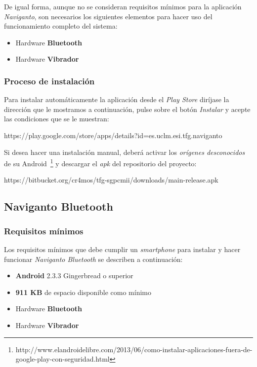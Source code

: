 De igual forma, aunque no se consideran requisitos mínimos para la aplicación \emph{Naviganto}, son
necesarios los siguientes elementos para hacer uso del funcionamiento completo del sistema:

\begin{itemize}
  \item Hardware \textbf{Bluetooth}
  \item Hardware \textbf{Vibrador}
\end{itemize}

\subsubsection{Proceso de instalación}

Para instalar automáticamente la aplicación desde el \emph{Play Store} diríjase la dirección que le
mostramos a continuación, pulse sobre el botón \emph{Instalar} y acepte las condiciones que se le
muestran:

\begin{listing}
https://play.google.com/store/apps/details?id=es.uclm.esi.tfg.naviganto
\end{listing}

Si desea hacer una instalación manual, deberá activar los \emph{orígenes desconocidos} de su
Android~\footnote{http://www.elandroidelibre.com/2013/06/como-instalar-aplicaciones-fuera-de-google-play-con-seguridad.html}
y descargar el \emph{apk} del repositorio del proyecto:

\begin{listing}
https://bitbucket.org/cr4mos/tfg-sgpcmii/downloads/main-release.apk
\end{listing}

\subsection{Naviganto Bluetooth}

\subsubsection{Requisitos mínimos}

Los requisitos mínimos que debe cumplir un \emph{smartphone} para instalar y hacer funcionar
\emph{Naviganto Bluetooth} se describen a continuación:

\begin{itemize}
  \item \textbf{Android} 2.3.3 Gingerbread o superior
  \item \textbf{911 KB} de espacio disponible como mínimo
  \item Hardware \textbf{Bluetooth}
  \item Hardware \textbf{Vibrador}
\end{itemize}

